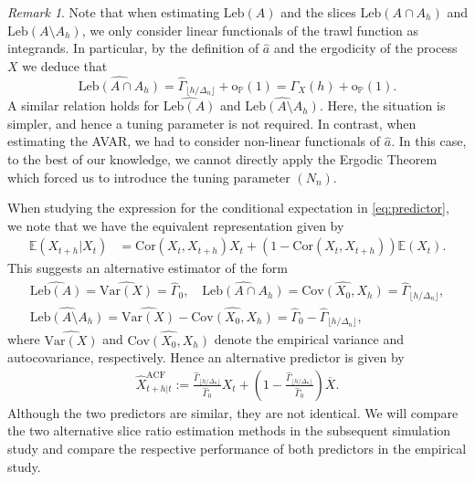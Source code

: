 \documentclass{article}
\theoremstyle{plain}
\theoremstyle{definition}
\theoremstyle{remark}
\newtheorem{remark}{Remark}[section]
\newcommand{\Var}{\ensuremath{\mathrm{Var}}}
\newcommand{\Leb}{\ensuremath{\mathrm{Leb}}}
\begin{document}
\begin{remark}
	Note that when estimating $\Leb(A)$ and the slices 	$\Leb(A\cap A_h)$ and $\Leb(A\setminus A_h)$, we only consider linear functionals of the trawl function as integrands. In particular, by the definition of $\hat{a}$ and the ergodicity of the process $X$ we deduce that
	\[ \widehat{\Leb(A\cap A_h)}=\hat{\varGamma}_{\lfloor h/\Delta_{n}\rfloor}+ \mathrm{o}_{\mathbb{P}}(1)=\varGamma_X(h)+ \mathrm{o}_{\mathbb{P}}(1).\]
	A similar relation holds for $\widehat{\Leb(A)}$ and $\widehat{\Leb(A\setminus A_h)}$. Here, the situation is simpler, and hence a tuning parameter is not required. In contrast, when estimating the AVAR, we had to consider non-linear functionals of $\hat{a}$. In this case, to the best of our knowledge, we cannot directly apply the Ergodic Theorem which forced us to introduce the tuning parameter $(N_n)$.
	
	
\end{remark}

When studying the expression for the conditional expectation  in \eqref{eq:predictor}, we note that we have the equivalent representation given by 
\begin{align*}
	\mathbb{E}(X_{t+h}|X_t)
		&= \mathrm{Cor}(X_t, X_{t+h})X_t+ (1-\mathrm{Cor}(X_t, X_{t+h}))\mathbb{E}(X_t).
\end{align*}
This suggests an alternative estimator of the form 
\begin{multline} \label{eq:acf-basedest}		\widehat{\Leb(A)}=\widehat{\Var(X)}=\hat \Gamma_0,\quad 
		\widehat{	\Leb(A\cap A_h)} =\widehat{\mathrm{Cov}(X_0, X_h)}=\hat \Gamma_{\lfloor h/\Delta_n\rfloor},
		\\
		\widehat{\Leb(A\setminus A_h)}=\widehat{\Var(X)}-\widehat{\mathrm{Cov}(X_0, X_h)}
		=\hat \Gamma_0-\hat \Gamma_{\lfloor h/\Delta_n\rfloor},
\end{multline}
where $\widehat{\Var(X)}$ and $\widehat{\mathrm{Cov}(X_0, X_h)}$
denote the empirical variance and autocovariance, respectively.
Hence an alternative  predictor is given by 
\begin{align}\label{eq:predictor2}
	\hat X_{t+h|t}^{\mathrm{ACF}}:=	\frac{\hat \Gamma_{\lfloor h/\Delta_n\rfloor}}{\hat \Gamma_0}X_t+\left(1-\frac{\hat \Gamma_{\lfloor h/\Delta_n\rfloor}}{\hat \Gamma_0}\right)\overline X.
\end{align}
Although the two predictors are similar, they are not identical.
We will compare the two alternative slice ratio estimation methods in   the subsequent simulation study and compare the respective performance of both predictors in the empirical study.
\end{document}
